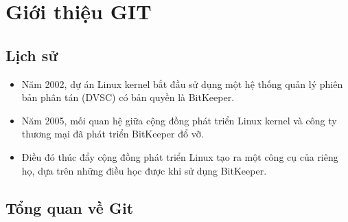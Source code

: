 \documentclass[12pt,a4paper]{report}
\begin{document}
\chapter{Giới thiệu GIT}


\section{Lịch sử}


\hspace{0.6cm}
\begin{itemize}
\item Năm 2002, dự án Linux kernel bắt đầu sử dụng một hệ thống quản lý phiên bản phân tán (DVSC) có bản quyền là BitKeeper.
\item Năm 2005, mối quan hệ giữa cộng đồng phát triển Linux kernel và công ty thương mại đã phát triển BitKeeper đổ vỡ.
\item Điều đó thúc đẩy cộng đồng phát triển Linux tạo ra một công cụ của riêng họ, dựa trên những điều học được khi sử dụng BitKeeper.
\end{itemize}
\section{Tổng quan về Git}
\end{document}
